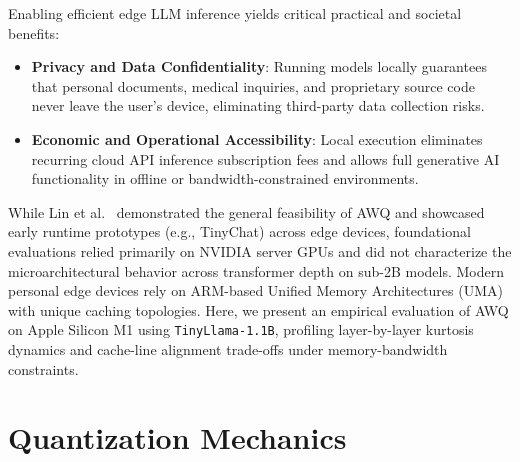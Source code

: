 \documentclass[runningheads,oribibl]{llncs}
\begin{document}
Enabling efficient edge LLM inference yields critical practical and societal benefits:
\begin{itemize}
    \item \textbf{Privacy and Data Confidentiality}: Running models locally guarantees that personal documents, medical inquiries, and proprietary source code never leave the user's device, eliminating third-party data collection risks.
    \item \textbf{Economic and Operational Accessibility}: Local execution eliminates recurring cloud API inference subscription fees and allows full generative AI functionality in offline or bandwidth-constrained environments.
\end{itemize}

While Lin et al.~\cite{lin2024awq} demonstrated the general feasibility of AWQ and showcased early runtime prototypes (e.g., TinyChat) across edge devices, foundational evaluations relied primarily on NVIDIA server GPUs and did not characterize the microarchitectural behavior across transformer depth on sub-2B models. Modern personal edge devices rely on ARM-based Unified Memory Architectures (UMA) with unique caching topologies. Here, we present an empirical evaluation of AWQ on Apple Silicon M1 using \texttt{TinyLlama-1.1B}, profiling layer-by-layer kurtosis dynamics and cache-line alignment trade-offs under memory-bandwidth constraints.

\section{Quantization Mechanics}
\end{document}
